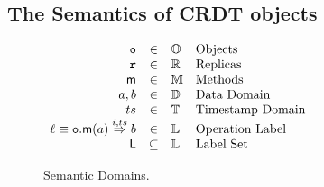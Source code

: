 \subsection{The Semantics of CRDT objects}\label{ssec:semantics}
\begin{wrapfigure}{r}{0.5\linewidth}
  \centering
  \vspace{-10pt}
  \(
  \begin{array}[t]{rcll}
    \mathtt{o} & \in  & \mathbb{O} & \text{Objects} \\
    \mathtt{r} & \in & \mathbb{R} & \text{Replicas} \\
    \mathsf{m} & \in & \mathbb{M} & \text{Methods}\\
    a, b & \in & \mathbb{D} & \text{Data Domain} \\
    ts & \in & \mathbb{T} & \text{Timestamp Domain} \\
    \ell \equiv {{\ensuremath{\mathtt{o}}.\ensuremath{\mathsf{m}}}}(a) \overset{i,ts}{\Rightarrow} b & \in & \mathbb{L} & \text{Operation Label} \\
    \mathsf{L} & \subseteq & \mathbb{L} & \text{Label Set}\\
  \end{array}
  \)
  \vspace{-5pt}
  \caption{Semantic Domains.}
  \vspace{-5pt}
  \label{fig:sem-dom}
\end{wrapfigure}

